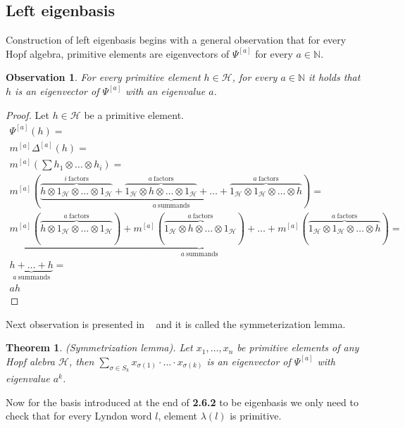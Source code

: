 \documentclass[a4paper, 12pt]{article}
\newtheorem{observation}{Observation}
\newtheorem{theorem}{Theorem}
\begin{document}
\subsection{Left eigenbasis}
Construction of left eigenbasis begins with a general observation that for every Hopf algebra,
primitive elements are eigenvectors of $\Psi^{[a]}$ for every $a \in \mathbb{N}$.
\begin{observation}
For every primitive element $h \in \mathcal{H}$, for every $a \in \mathbb{N}$ it holds that $h$ is an
eigenvector of $\Psi^{[a]}$ with an eigenvalue $a$.
\end{observation}
\begin{proof}
Let $h \in \mathcal{H}$ be a primitive element.
\begin{gather*}
\Psi^{[a]}(h) = \\ m^{[a]}\Delta^{[a]}(h) = \\
m^{[a]}(\sum h_1 \otimes \dots \otimes h_i) = \\
m^{[a]}(\underbrace{\overbrace{h \otimes 1_\mathcal{H} \otimes \dots \otimes 1_\mathcal{H}}^{i\
\mathrm{factors}} +
\overbrace{1_\mathcal{H} \otimes h \otimes \dots \otimes 1_\mathcal{H}}^{a\ \mathrm{factors}} +
\dots +
\overbrace{1_\mathcal{H} \otimes 1_\mathcal{H} \otimes \dots \otimes h}^{a\ \mathrm{factors}}}_{a\
\mathrm{summands}} ) = \\
\underbrace{m^{[a]}(\overbrace{h \otimes 1_\mathcal{H} \otimes \dots \otimes 1_\mathcal{H}}^{a\
\mathrm{factors}}) +
m^{[a]}(\overbrace{1_\mathcal{H} \otimes h \otimes \dots \otimes 1_\mathcal{H}}^{a\ \mathrm{factors}}) +
\dots +
m^{[a]}(\overbrace{1_\mathcal{H} \otimes 1_\mathcal{H} \otimes \dots \otimes h}^{a\ \mathrm{factors}})}_{a\
\mathrm{summands}} = \\
\underbrace{h + \dots + h}_{a\ \mathrm{summands}} = \\
ah
\end{gather*}

\end{proof}
Next observation is presented in ~\cite{Diaconis2014} and it is called the symmeterization lemma.
\begin{theorem}
(Symmetrization lemma). Let $x_1, \dots, x_n$ be primitive elements of any Hopf alebra $\mathcal{H}$, then
$\displaystyle\sum_{\sigma \in S_k} x_{\sigma(1)}\cdot\ldots\cdot x_{\sigma(k)}$ is an eigenvector of
$\Psi^{[a]}$ with eigenvalue $a^k$.
\end{theorem}

Now for the basis introduced at the end of \textbf{2.6.2} to be eigenbasis we only need to check that for
every Lyndon
word $l$, element $\lambda(l)$ is primitive.
\end{document}

